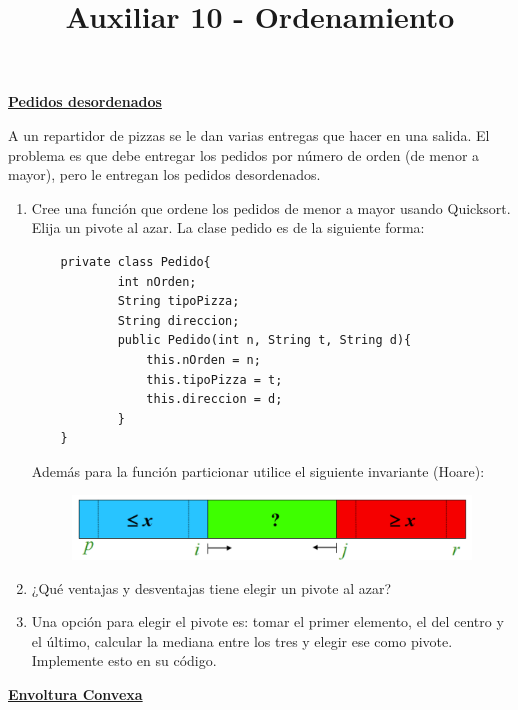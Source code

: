 \documentclass[dcc,uchile]{fcfmcourse}
\title{Auxiliar 10 - Ordenamiento}
\newcommand{\ptitle}[1]{\underline{\textbf{#1}}}
\begin{document}
\maketitle

\vspace{-1ex}


\begin{problems}


\problem \ptitle{Pedidos desordenados}

A un repartidor de pizzas se le dan varias entregas que hacer en una salida. El problema es que debe entregar los pedidos por número de orden (de menor a mayor), pero le entregan los pedidos desordenados.
\begin{enumerate}
    \item Cree una función que ordene los pedidos de menor a mayor usando Quicksort. Elija un pivote al azar.
    La clase pedido es de la siguiente forma:
    \begin{lstlisting}
    private class Pedido{
            int nOrden;
            String tipoPizza;
            String direccion;
            public Pedido(int n, String t, String d){
                this.nOrden = n;
                this.tipoPizza = t;
                this.direccion = d;
            }
    }
    \end{lstlisting}
    
    Además para la función particionar utilice el siguiente invariante (Hoare):
    
    \begin{figure}[!ht]
        \centering
        \includegraphics[scale=0.4]{imagenes/Hoare.png}
    \end{figure}
    
    \item ¿Qué ventajas y desventajas tiene elegir un pivote al azar?
    
    \item Una opción para elegir el pivote es: tomar el primer elemento, el del centro y el último, calcular la mediana entre los tres y elegir ese como pivote. Implemente esto en su código.

\end{enumerate} 

\problem \ptitle{Envoltura Convexa}


\end{problems}
\end{document}
